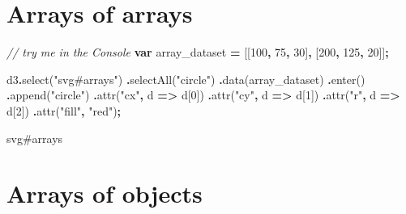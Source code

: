 \documentclass[
  openany]{book}
\newenvironment{Shaded}{\begin{snugshade}}{\end{snugshade}}
\newcommand{\CommentTok}[1]{\textcolor[rgb]{0.56,0.35,0.01}{\textit{#1}}}
\newcommand{\DecValTok}[1]{\textcolor[rgb]{0.00,0.00,0.81}{#1}}
\newcommand{\FunctionTok}[1]{\textcolor[rgb]{0.00,0.00,0.00}{#1}}
\newcommand{\KeywordTok}[1]{\textcolor[rgb]{0.13,0.29,0.53}{\textbf{#1}}}
\newcommand{\NormalTok}[1]{#1}
\newcommand{\OperatorTok}[1]{\textcolor[rgb]{0.81,0.36,0.00}{\textbf{#1}}}
\newcommand{\StringTok}[1]{\textcolor[rgb]{0.31,0.60,0.02}{#1}}
\begin{document}
\hypertarget{arrays-of-arrays}{%
\section{Arrays of arrays}\label{arrays-of-arrays}}

\begin{Shaded}
\begin{Highlighting}[]
\CommentTok{// try me in the Console }
\KeywordTok{var}\NormalTok{ array\_dataset }\OperatorTok{=}\NormalTok{ [[}\DecValTok{100}\OperatorTok{,} \DecValTok{75}\OperatorTok{,} \DecValTok{30}\NormalTok{]}\OperatorTok{,}\NormalTok{ [}\DecValTok{200}\OperatorTok{,} \DecValTok{125}\OperatorTok{,} \DecValTok{20}\NormalTok{]]}\OperatorTok{;}

\NormalTok{d3}\OperatorTok{.}\FunctionTok{select}\NormalTok{(}\StringTok{"svg\#arrays"}\NormalTok{)}
  \OperatorTok{.}\FunctionTok{selectAll}\NormalTok{(}\StringTok{"circle"}\NormalTok{)}
  \OperatorTok{.}\FunctionTok{data}\NormalTok{(array\_dataset)}
  \OperatorTok{.}\FunctionTok{enter}\NormalTok{()}
  \OperatorTok{.}\FunctionTok{append}\NormalTok{(}\StringTok{"circle"}\NormalTok{)}
    \OperatorTok{.}\FunctionTok{attr}\NormalTok{(}\StringTok{"cx"}\OperatorTok{,}\NormalTok{ d }\KeywordTok{=\textgreater{}}\NormalTok{ d[}\DecValTok{0}\NormalTok{])}
    \OperatorTok{.}\FunctionTok{attr}\NormalTok{(}\StringTok{"cy"}\OperatorTok{,}\NormalTok{ d }\KeywordTok{=\textgreater{}}\NormalTok{ d[}\DecValTok{1}\NormalTok{])}
    \OperatorTok{.}\FunctionTok{attr}\NormalTok{(}\StringTok{"r"}\OperatorTok{,}\NormalTok{ d }\KeywordTok{=\textgreater{}}\NormalTok{ d[}\DecValTok{2}\NormalTok{])}
    \OperatorTok{.}\FunctionTok{attr}\NormalTok{(}\StringTok{"fill"}\OperatorTok{,} \StringTok{"red"}\NormalTok{)}\OperatorTok{;}
\end{Highlighting}
\end{Shaded}

svg\#arrays

\hypertarget{arrays-of-objects}{%
\section{Arrays of objects}\label{arrays-of-objects}}
\end{document}
